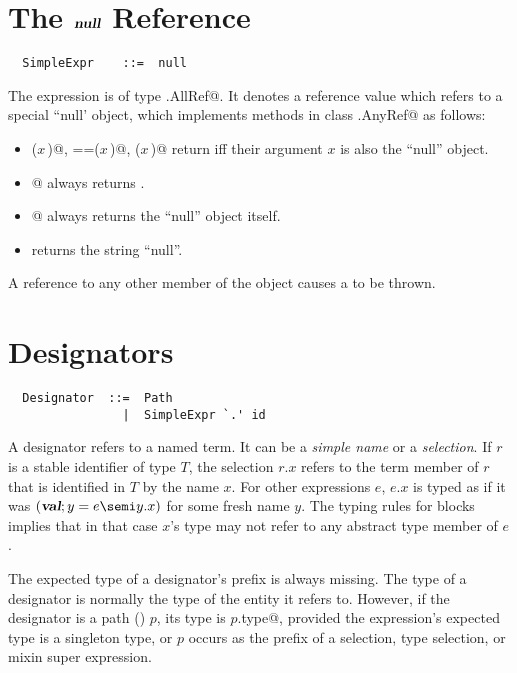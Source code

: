 \documentclass[a4paper,12pt,twoside,titlepage]{book}
\begin{document}
\section{The $\mbox{\sl\bfseries null}$ Reference}

\syntax\begin{lstlisting}
  SimpleExpr    ::=  null
\end{lstlisting}

The  expression is of type \lstinline@scala.AllRef@. It
denotes a reference value which refers to a special ``null' object,
which implements methods in class \lstinline@scala.AnyRef@ as follows:
\begin{itemize}
\item
\lstinline@eq($x\,$)@, \lstinline@==($x\,$)@, \lstinline@equals($x\,$)@ return  iff their
argument $x$ is also the ``null'' object.
\item
\lstinline@isInstanceOf[$T\,$]@ always returns .
\item
\lstinline@asInstanceOf[$T\,$]@ always returns the ``null'' object itself.
\item
{} returns the string ``null''.
\end{itemize}
A reference to any other member of the  object causes a
 to be thrown. 

\section{Designators}
\label{sec:designators}

\syntax\begin{lstlisting}
  Designator  ::=  Path
                |  SimpleExpr `.' id
\end{lstlisting}

A designator refers to a named term. It can be a {\em simple name} or
a {\em selection}. If $r$ is a stable identifier of type $T$, the
selection $r.x$ refers to the term member of $r$ that is identified in
$T$ by the name $x$.  For other expressions $e$, $e.x$ is typed as if
it was $(\VAL;y=e\semi y.x)$ for some fresh name $y$. The typing rules
for blocks implies that in that case $x$'s type may not refer to any
abstract type member of $e$.

The expected type of a designator's prefix is always missing.
The
type of a designator is normally the type of the entity it refers
to. However, if the designator is a path () $p$,
its type is \lstinline@$p$.type@, provided the expression's expected type is
a singleton type, or $p$ occurs as the prefix of a selection,
type selection, or mixin super expression.
\end{document}
